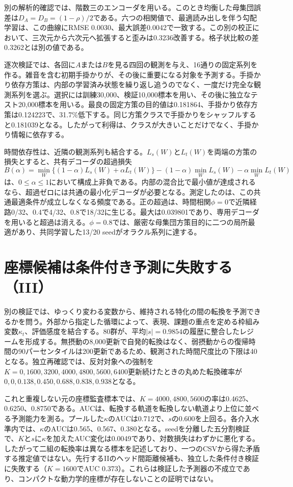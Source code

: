 別の解析的確認では、階数三のエンコーダを用いる。このとき均衡した母集団誤差は$D_A=D_B=(1-\rho)/2$である。六つの相関値で、最適読み出しを伴う勾配学習は、この曲線にRMSE 0.0030、最大誤差0.0042で一致する。この別の校正において、三次元から六次元へ拡張すると歪みは0.3236改善する。格子状比較の差0.3262とは別の値である。

逐次検証では、各回に$A$または$B$を見る四回の観測を与え、16通りの固定系列を作る。雑音を含む初期手掛かりが、その後に重要になる対象を予測する。手掛かり依存方策は、内部の学習済み状態を繰り返し追うのでなく、一度だけ完全な観測系列を選ぶ。選択には訓練30,000、検証10,000標本を用い、その後に独立なテスト20,000標本を用いる。最良の固定方策の目的値は0.181864、手掛かり依存方策は0.124223で、31.7\%低下する。同じ方策クラスで手掛かりをシャッフルすると0.181039となる。したがって利得は、クラスが大きいことだけでなく、手掛かり情報に依存する。

時間依存性は、近隣の観測系列も結合する。$L_s(W)$と$L_t(W)$を両端の方策の損失とすると、共有デコーダの超過損失
\begin{equation}
B(\alpha)=\min_W\{(1-\alpha)L_s(W)+\alpha L_t(W)\}
 -(1-\alpha)\min_W L_s(W)-\alpha\min_W L_t(W)
\end{equation}
は、$0\leq\alpha\leq1$において構成上非負である。内部の混合比で最小値が達成されるなら、超過ゼロには共通の最小化デコーダが必要となる。測定したのは、この共通最適条件が成立しなくなる頻度である。正の超過は、時間相関$\phi=0$で近隣経路0/32、0.4で4/32、0.8で18/32に生じる。最大は0.039801であり、専用デコーダを用いると超過は消える。$\phi=0.8$では、厳密な母集団方策目的に二つの局所最適があり、共同学習した13/20 seedがオラクル系列に達する。


\section{座標候補は条件付き予測に失敗する（III）}
\label{app:coordinate}
別の検証では、ゆっくり変わる変数から、維持される特化の間の転換を予測できるかを問う。外部から指定した循環によって、表現、課題の重点を定める枠組み変数$\kappa_t$、評価感度を結合する。80群が、平均$|s|=0.9854$の履歴に整合したレジームを形成する。無摂動の8,000更新で自発的転換はなく、弱摂動からの復帰時間の90パーセンタイルは200更新であるため、観測された時間尺度比の下限は40となる。独立再確認では、反対対象への強制を$K=0,1600,3200,4000,4800,5600,6400$更新続けたときの丸めた転換確率が$0,0,0.138,0.450,0.688,0.838,0.938$となる。

これと重複しない元の座標監査標本では、$K=4000,4800,5600$の率は0.4625、0.6250、0.8750である。AUCは、転換する軌道を転換しない軌道より上位に並べる予測能力を測る。プールした$\kappa$のAUCは0.712で、$s$の0.600を上回る。各介入水準内では、$\kappa$のAUCは0.565、0.567、0.380となる。seedを分離した五分割検証で、$K$と$s$に$\kappa$を加えたAUC変化は0.0049であり、対数損失はわずかに悪化する。したがって二組の転換率は異なる標本を記述しており、一つのCSVから得た矛盾する推定値ではない。先行するIIのヘッド間距離候補も、独立した条件付き検証に失敗する（$K=1600$でAUC 0.373）。これらは検証した予測器の不成立であり、コンパクトな動力学的座標が存在しないことの証明ではない。


